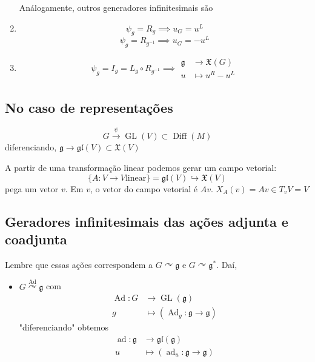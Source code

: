 \begin{example}
\begin{example}
\begin{enumerate}
	Análogamente,  outros generadores infinitesimais são

\item \[\psi_g=R_g\implies u_G=u^L\]
	\[\psi_g=R_{g ^{-1}}\implies u_G=-u^L\]
\item \[\psi_g=I_g=L_g\circ R_{g ^{-1}}\implies \begin{aligned}
	\mathfrak{g} &\longrightarrow \mathfrak{X}(G) \\
	u &\longmapsto u^R-u^L
\end{aligned} \]
	\end{enumerate}
\end{example}

\subsection{No caso de representações}
\[G \overset{\psi}{\longrightarrow}\operatorname{GL}(V)\subset \operatorname{Diff}(M)\]
diferenciando,
$\mathfrak{g} \longrightarrow \mathfrak{gl}(V) \subset \mathfrak{X}(V)$ 

A partir de uma transformação linear podemos gerar um campo vetorial:
\[\{A:V\to V \text{linear} \} =\mathfrak{gl}(V) \hookrightarrow \mathfrak{X}(V)\]
pega um vetor $v$. Em $v$, o vetor do campo vetorial  é $Av$.
$X_A(v)=Av\in T_vV=V$

\subsection{Geradores infinitesimais das ações adjunta e coadjunta}

Lembre que essas ações correspondem a $G\curvearrowright \mathfrak{g}$ e $G\curvearrowright \mathfrak{g}^*$. Daí,
\begin{itemize}
\item $G\overset{\operatorname{Ad}}{\curvearrowright }\mathfrak{g}$ com
	\begin{align*}
		\operatorname{Ad}: G &\longrightarrow \operatorname{GL}(\mathfrak{g}) \\
		g &\longmapsto (\operatorname{Ad}_g:\mathfrak{g} \to \mathfrak{g} )
	\end{align*}
	"diferenciando" obtemos
	\begin{align*}
		\operatorname{ad}: \mathfrak{g} &\longrightarrow \mathfrak{gl}(\mathfrak{g}) \\
		u &\longmapsto (\operatorname{ad}_u:\mathfrak{g} \to \mathfrak{g} )
	\end{align*}
	
\end{itemize}


\end{example}

